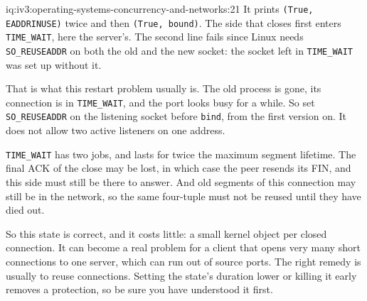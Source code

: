 \begin{solution}{iq:iv3:operating-systems-concurrency-and-networks:21}
It prints \texttt{(True, \textquotesingle{}EADDRINUSE\textquotesingle{})} twice and then \texttt{(True, \textquotesingle{}bound\textquotesingle{})}. The side that closes first enters \texttt{TIME\_WAIT}, here the server's. The second line fails since Linux needs \texttt{SO\_REUSEADDR} on both the old and the new socket: the socket left in \texttt{TIME\_WAIT} was set up without it.

That is what this restart problem usually is. The old process is gone, its connection is in \texttt{TIME\_WAIT}, and the port looks busy for a while. So set \texttt{SO\_REUSEADDR} on the listening socket before \texttt{bind}, from the first version on. It does not allow two active listeners on one address.

\texttt{TIME\_WAIT} has two jobs, and lasts for twice the maximum segment lifetime. The final ACK of the close may be lost, in which case the peer resends its FIN, and this side must still be there to answer. And old segments of this connection may still be in the network, so the same four-tuple must not be reused until they have died out.

So this state is correct, and it costs little: a small kernel object per closed connection. It can become a real problem for a client that opens very many short connections to one server, which can run out of source ports. The right remedy is usually to reuse connections. Setting the state's duration lower or killing it early removes a protection, so be sure you have understood it first.

\end{solution}


